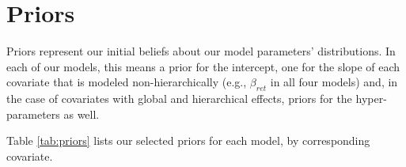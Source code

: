 \documentclass[12pt]{article}
\begin{document}
\section{Priors}

Priors represent our initial beliefs about our model parameters' distributions.
In each of our models, this means a prior for the intercept, one for the slope of each covariate that is modeled non-hierarchically (e.g., $\beta_{ret}$ in all four models) and, in the case of covariates with global and hierarchical effects, priors for the hyper-parameters as well.

Table \ref{tab:priors} lists our selected priors for each model, by corresponding covariate.

\begin{table}[h]
\end{table}
\end{document}

